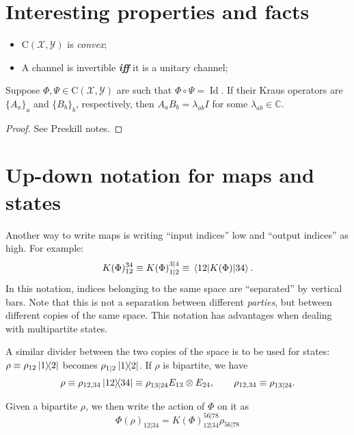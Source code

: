 \documentclass[a4paper]{report}
\newcommand{\CC}{\mathbb{C}}
\newcommand{\calY}{{\mathcal{Y}}}
\newcommand{\calX}{{\mathcal{X}}}
\newcommand{\rmC}{{\mathrm{C}}}
\DeclareMathOperator{\Id}{Id}
\begin{document}
\section{Interesting properties and facts}

\begin{itemize}
	\item $\rmC(\calX,\calY)$ is \emph{convex};
	\item A channel is invertible \emph{\textbf{iff}} it is a unitary channel;
\end{itemize}

\begin{thm}
	Suppose $\Phi,\Psi\in\rmC(\calX,\calY)$ are such that $\Phi\circ\Psi=\Id$. If their Kraus operators are $\{A_a\}_a$ and $\{B_b\}_b$, respectively, then $A_a B_b=\lambda_{ab} I$ for some $\lambda_{ab}\in\CC$.
\end{thm}
\begin{proof}
	See Preskill notes.
\end{proof}

\section{Up-down notation for maps and states}

Another way to write maps is writing ``input indices'' low and ``output indices'' as high. For example:
\begin{equation}
	K(\Phi)_{12}^{34}\equiv K(\Phi)_{1|2}^{3|4} \equiv \mel{12}{K(\Phi)}{34}.
\end{equation}
In this notation, indices belonging to the same space are ``separated'' by vertical bars.
Note that this is not a separation between different \emph{parties}, but between different copies of the same space.
This notation has advantages when dealing with multipartite states.

A similar divider between the two copies of the space is to be used for states:
$\rho \equiv \rho_{12}\ketbra{1}{2}$ becomes $\rho_{1|2}\ketbra{1}{2}$.
If $\rho$ is bipartite, we have
\begin{equation}
	\rho \equiv \rho_{12,34} \ketbra{12}{34} \equiv \rho_{13|24} E_{13}\otimes E_{24},
	\qquad
	\rho_{12,34} \equiv \rho_{13|24}.
\end{equation}


Given a bipartite $\rho$, we then write the action of $\Phi$ on it as
\begin{equation}
	\Phi(\rho)_{12|34} =
	K(\Phi)_{12|34}^{56|78} \rho_{56|78}
\end{equation}
\end{document}
